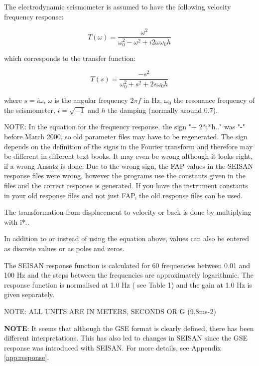 The electrodynamic seismometer is assumed to have the following velocity frequency response: 

\begin{displaymath}
T(\omega) = \frac{\omega^{2}}{\omega_{0}^2 - \omega^2 + i 2 \omega \omega_0 h}
\end{displaymath}

which corresponds to the transfer function: 

\begin{displaymath}
T(s) = \frac{-s^{2}}{\omega_{0}^2 + s^2 + 2 s \omega_0 h}
\end{displaymath}

where $s=i\omega$, $\omega$ is the angular frequency $2\pi f$ in Hz, $\omega_0$ the 
resonance frequency of the seismometer, $i = \sqrt{-1}$ 
and $h$ the damping (normally around 0.7). 

NOTE: In the equation for the frequency response, the sign "+ 2*i*h.." was "-" before March 2000, so old parameter files may have to be regenerated. The sign depends on the definition of the signs in the Fourier transform and therefore may be different  in different text books. It may even be wrong although it looks right, if a wrong Ansatz is done. Due to the wrong sign, the FAP values in the SEISAN response files were wrong, however the programs use the constants given in the files and the correct response is generated. If you have the instrument constants in your old response files and not just FAP, the old response files can be used. 

The transformation from displacement to velocity or back is done by multiplying  with i*.. 

In addition to or instead of using the equation above, values can also be entered as discrete values or as poles and zeros. 

The SEISAN response function is calculated for 60 frequencies between 0.01 and 100 Hz and the steps between the frequencies are approximately logarithmic. The response function is normalised at 
1.0 Hz ( see Table 1) and the gain at 1.0 Hz is given separately.  

NOTE: ALL UNITS ARE IN METERS, SECONDS OR G (9.8ms-2)  

\textbf{NOTE}: It seems that although the GSE format is clearly defined, there 
has been different interpretations. This has also led to changes in 
SEISAN since the GSE response was introduced with SEISAN. For more 
details, see Appendix \ref{app:response}. 

